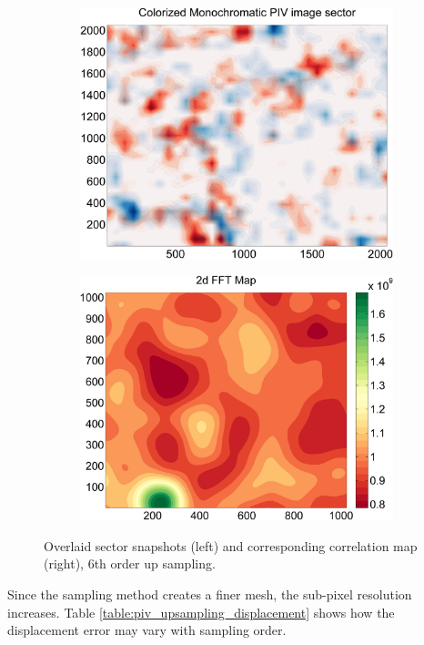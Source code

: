 \begin{figure}[H]
	\begin{subfigure}{.49\textwidth}
		\centering
		\includegraphics[width=.9\linewidth]{figs/piv_method/pive-fig_order6}
	\end{subfigure} 
	\begin{subfigure}{.49\textwidth}
		\centering
		\includegraphics[width=.9\linewidth]{figs/piv_method/pive_fft_order6}
	\end{subfigure}	
	\caption{Overlaid sector snapshots (left) and corresponding correlation 
		map (right), 6th order up sampling.}
	\label{fig:piv_sector_overlay_fft_6up}
\end{figure}
\vspace{16pt}

Since the sampling method creates a finer mesh, the sub-pixel resolution 
increases. Table \ref{table:piv_upsampling_displacement} shows how the 
displacement error may vary with sampling order.

